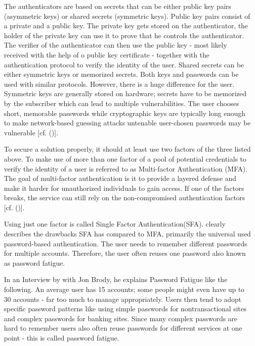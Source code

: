 The authenticators are based on secrets that can be either public key pairs (asymmetric keys) or shared secrets (symmetric keys). Public key pairs consist of a private and a public key. The private key gets stored on the authenticator, the holder of the private key can use it to prove that he controls the authenticator. The verifier of the authenticator can then use the public key - most likely received with the help of o public key certificate - together with the authentication protocol to verify the identity of the user. Shared secrets can be either symmetric keys or memorized secrets. Both keys and passwords can be used with similar protocols. However, there is a huge difference for the user. Symmetric keys are generally stored on hardware; secrets have to be memorized by the subscriber which can lead to multiple vulnerabilities. The user chooses short, memorable passwords while cryptographic keys are typically long enough to make network-based guessing attacks untenable user-chosen passwords may be vulnerable [cf. (\cite{NIST:2017:DIG})]. 


To secure a solution properly, it should at least use two factors of the three listed above. To make use of more than one factor of a pool of potential credentials to verify the identity of a user is referred to as Multi-factor Authentication (MFA). The goal of multi-factor authentication is it to provide a layered defense and make it harder for unauthorized individuals to gain access. If one of the factors breaks, the service can still rely on the non-compromised authentication factors [cf. (\cite{Dasgupta:2017:AUA})].

Using just one factor is called Single Factor Authentication(SFA). \cite{Dasgupta:2017:AUA} clearly describes the drawbacks SFA has compared to MFA, primarily the universal used password-based authentication. The user needs to remember different passwords for multiple accounts. Therefore, the user often reuses one password also known as password fatigue.

In an Interview by \cite{Tomkins:2009:DPF} with Jon Brody, he explains Password Fatigue like the following. An average user has 15 accounts; some people might even have up to 30 accounts - far too much to manage appropriately. Users then tend to adopt specific password patterns like using simple passwords for nontransactional sites and complex passwords for banking sites. Since many complex passwords are hard to remember users also often reuse passwords for different services at one point - this is called password fatigue. 

